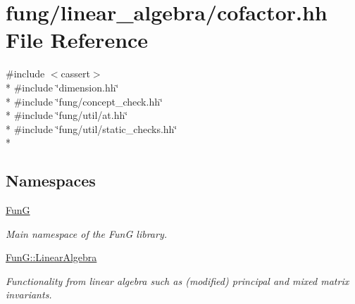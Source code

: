 \hypertarget{cofactor_8hh}{}\section{fung/linear\+\_\+algebra/cofactor.hh File Reference}
\label{cofactor_8hh}
{\ttfamily \#include $<$cassert$>$}\\*
{\ttfamily \#include \char`\"{}dimension.\+hh\char`\"{}}\\*
{\ttfamily \#include \char`\"{}fung/concept\+\_\+check.\+hh\char`\"{}}\\*
{\ttfamily \#include \char`\"{}fung/util/at.\+hh\char`\"{}}\\*
{\ttfamily \#include \char`\"{}fung/util/static\+\_\+checks.\+hh\char`\"{}}\\*
\subsection*{Namespaces}
\begin{DoxyCompactItemize}
\item 
 \hyperlink{namespaceFunG}{FunG}
\begin{DoxyCompactList}\small\item\em Main namespace of the FunG library. \end{DoxyCompactList}\item 
 \hyperlink{namespaceFunG_1_1LinearAlgebra}{Fun\+G\+::\+Linear\+Algebra}
\begin{DoxyCompactList}\small\item\em Functionality from linear algebra such as (modified) principal and mixed matrix invariants. \end{DoxyCompactList}\end{DoxyCompactItemize}
